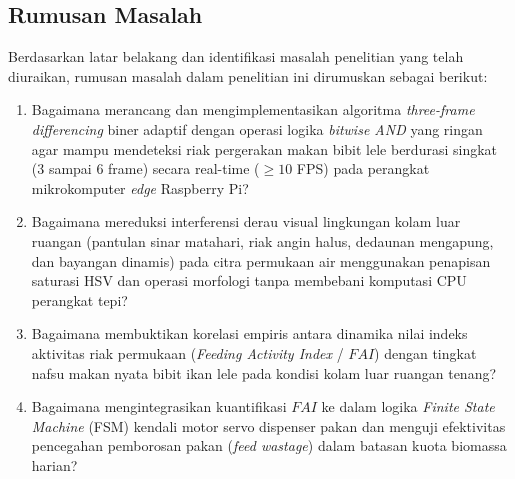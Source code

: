 \subsection{Rumusan Masalah}
Berdasarkan latar belakang dan identifikasi masalah penelitian yang telah diuraikan, rumusan masalah dalam penelitian ini dirumuskan sebagai berikut:
\begin{enumerate}
    \item Bagaimana merancang dan mengimplementasikan algoritma \textit{three-frame differencing} biner adaptif dengan operasi logika \textit{bitwise AND} yang ringan agar mampu mendeteksi riak pergerakan makan bibit lele berdurasi singkat (3 sampai 6 frame) secara real-time ($\ge 10$ FPS) pada perangkat mikrokomputer \textit{edge} Raspberry Pi?
    \item Bagaimana mereduksi interferensi derau visual lingkungan kolam luar ruangan (pantulan sinar matahari, riak angin halus, dedaunan mengapung, dan bayangan dinamis) pada citra permukaan air menggunakan penapisan saturasi HSV dan operasi morfologi tanpa membebani komputasi CPU perangkat tepi?
    \item Bagaimana membuktikan korelasi empiris antara dinamika nilai indeks aktivitas riak permukaan (\textit{Feeding Activity Index} / $FAI$) dengan tingkat nafsu makan nyata bibit ikan lele pada kondisi kolam luar ruangan tenang?
    \item Bagaimana mengintegrasikan kuantifikasi $FAI$ ke dalam logika \textit{Finite State Machine} (FSM) kendali motor servo dispenser pakan dan menguji efektivitas pencegahan pemborosan pakan (\textit{feed wastage}) dalam batasan kuota biomassa harian?
\end{enumerate}


